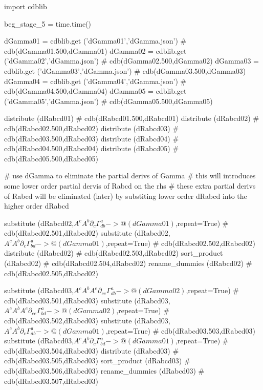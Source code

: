 \documentclass[12pt]{cdblatex}
\begin{document}
\begin{cadabra}
   import cdblib

   beg_stage_5 = time.time()

   dGamma01 = cdblib.get ('dGamma01','dGamma.json')  # cdb(dGamma01.500,dGamma01)
   dGamma02 = cdblib.get ('dGamma02','dGamma.json')  # cdb(dGamma02.500,dGamma02)
   dGamma03 = cdblib.get ('dGamma03','dGamma.json')  # cdb(dGamma03.500,dGamma03)
   dGamma04 = cdblib.get ('dGamma04','dGamma.json')  # cdb(dGamma04.500,dGamma04)
   dGamma05 = cdblib.get ('dGamma05','dGamma.json')  # cdb(dGamma05.500,dGamma05)

   distribute (dRabcd01)   # cdb(dRabcd01.500,dRabcd01)
   distribute (dRabcd02)   # cdb(dRabcd02.500,dRabcd02)
   distribute (dRabcd03)   # cdb(dRabcd03.500,dRabcd03)
   distribute (dRabcd04)   # cdb(dRabcd04.500,dRabcd04)
   distribute (dRabcd05)   # cdb(dRabcd05.500,dRabcd05)

   # use dGamma to eliminate the partial derivs of Gamma
   # this will introduces some lower order partial dervis of Rabcd on the rhs
   # these extra partial derivs of Rabcd will be eliminated (later) by substiting lower order dRabcd into the higher order dRabcd

   substitute (dRabcd02,$A^{c}A^{b}\partial_{c}{\Gamma^{a}_{d b}} -> @(dGamma01)$,repeat=True)                # cdb(dRabcd02.501,dRabcd02)
   substitute (dRabcd02,$A^{c}A^{b}\partial_{c}{\Gamma^{a}_{b d}} -> @(dGamma01)$,repeat=True)                # cdb(dRabcd02.502,dRabcd02)
   distribute (dRabcd02)                                                                                      # cdb(dRabcd02.503,dRabcd02)
   sort_product   (dRabcd02)                                                                                  # cdb(dRabcd02.504,dRabcd02)
   rename_dummies (dRabcd02)                                                                                  # cdb(dRabcd02.505,dRabcd02)


   substitute (dRabcd03,$A^{c}A^{b}A^{e}\partial_{c e}{\Gamma^{a}_{d b}} -> @(dGamma02)$,repeat=True)         # cdb(dRabcd03.501,dRabcd03)
   substitute (dRabcd03,$A^{c}A^{b}A^{e}\partial_{c e}{\Gamma^{a}_{b d}} -> @(dGamma02)$,repeat=True)         # cdb(dRabcd03.502,dRabcd03)
   substitute (dRabcd03,$A^{c}A^{b}\partial_{c}{\Gamma^{a}_{d b}} -> @(dGamma01)$,repeat=True)                # cdb(dRabcd03.503,dRabcd03)
   substitute (dRabcd03,$A^{c}A^{b}\partial_{c}{\Gamma^{a}_{b d}} -> @(dGamma01)$,repeat=True)                # cdb(dRabcd03.504,dRabcd03)
   distribute (dRabcd03)                                                                                      # cdb(dRabcd03.505,dRabcd03)
   sort_product   (dRabcd03)                                                                                  # cdb(dRabcd03.506,dRabcd03)
   rename_dummies (dRabcd03)                                                                                  # cdb(dRabcd03.507,dRabcd03)


\end{cadabra}
\end{document}

